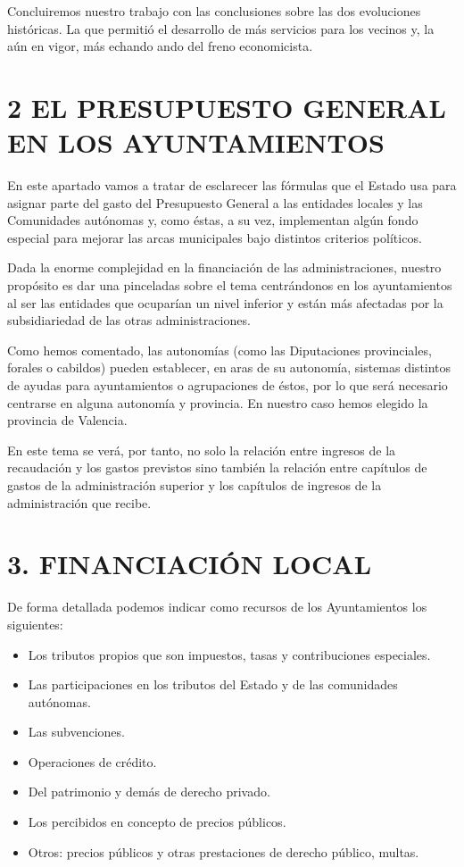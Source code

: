 \documentclass[
]{article}
\begin{document}
Concluiremos nuestro trabajo con las conclusiones sobre las dos
evoluciones históricas. La que permitió el desarrollo de más servicios
para los vecinos y, la aún en vigor, más echando ando del freno
economicista.

\hypertarget{el-presupuesto-general-en-los-ayuntamientos}{%
\section{2 EL PRESUPUESTO GENERAL EN LOS
AYUNTAMIENTOS}\label{el-presupuesto-general-en-los-ayuntamientos}}

En este apartado vamos a tratar de esclarecer las fórmulas que el Estado
usa para asignar parte del gasto del Presupuesto General a las entidades
locales y las Comunidades autónomas y, como éstas, a su vez, implementan
algún fondo especial para mejorar las arcas municipales bajo distintos
criterios políticos.

Dada la enorme complejidad en la financiación de las administraciones,
nuestro propósito es dar una pinceladas sobre el tema centrándonos en
los ayuntamientos al ser las entidades que ocuparían un nivel inferior y
están más afectadas por la subsidiariedad de las otras administraciones.

Como hemos comentado, las autonomías (como las Diputaciones
provinciales, forales o cabildos) pueden establecer, en aras de su
autonomía, sistemas distintos de ayudas para ayuntamientos o
agrupaciones de éstos, por lo que será necesario centrarse en alguna
autonomía y provincia. En nuestro caso hemos elegido la provincia de
Valencia.

En este tema se verá, por tanto, no solo la relación entre ingresos de
la recaudación y los gastos previstos sino también la relación entre
capítulos de gastos de la administración superior y los capítulos de
ingresos de la administración que recibe.

\hypertarget{financiaciuxf3n-local}{%
\section{3. FINANCIACIÓN LOCAL}\label{financiaciuxf3n-local}}

De forma detallada podemos indicar como recursos de los Ayuntamientos
los siguientes:

\begin{itemize}
\item
  Los tributos propios que son impuestos, tasas y contribuciones
  especiales.
\item
  Las participaciones en los tributos del Estado y de las comunidades
  autónomas.
\item
  Las subvenciones.
\item
  Operaciones de crédito.
\item
  Del patrimonio y demás de derecho privado.
\item
  Los percibidos en concepto de precios públicos.
\item
  Otros: precios públicos y otras prestaciones de derecho público,
  multas.
\end{itemize}
\end{document}
